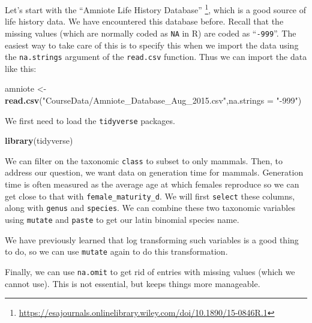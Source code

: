\documentclass[
  a4paperpaper,
]{book}
\newenvironment{Shaded}{\begin{snugshade}}{\end{snugshade}}
\newcommand{\DataTypeTok}[1]{\textcolor[rgb]{0.13,0.29,0.53}{#1}}
\newcommand{\KeywordTok}[1]{\textcolor[rgb]{0.13,0.29,0.53}{\textbf{#1}}}
\newcommand{\NormalTok}[1]{#1}
\newcommand{\StringTok}[1]{\textcolor[rgb]{0.31,0.60,0.02}{#1}}
\begin{document}
Let's start with the ``Amniote Life History Database'' \footnote{\url{https://esajournals.onlinelibrary.wiley.com/doi/10.1890/15-0846R.1}}, which is a good source of life history data. We have encountered this database before. Recall that the missing values (which are normally coded as \texttt{NA} in R) are coded as ``\texttt{-999}''. The easiest way to take care of this is to specify this when we import the data using the \texttt{na.strings} argument of the \texttt{read.csv} function. Thus we can import the data like this:

\begin{Shaded}
\begin{Highlighting}[]
\NormalTok{amniote \textless{}{-}}\StringTok{ }\KeywordTok{read.csv}\NormalTok{(}\StringTok{"CourseData/Amniote\_Database\_Aug\_2015.csv"}\NormalTok{,}\DataTypeTok{na.strings =} \StringTok{"{-}999"}\NormalTok{)}
\end{Highlighting}
\end{Shaded}

We first need to load the \texttt{tidyverse} packages.

\begin{Shaded}
\begin{Highlighting}[]
\KeywordTok{library}\NormalTok{(tidyverse)}
\end{Highlighting}
\end{Shaded}

We can filter on the taxonomic \texttt{class} to subset to only mammals. Then, to address our question, we want data on generation time for mammals. Generation time is often measured as the average age at which females reproduce so we can get close to that with \texttt{female\_maturity\_d}. We will first \texttt{select} these columns, along with \texttt{genus} and \texttt{species}. We can combine these two taxonomic variables using \texttt{mutate} and \texttt{paste} to get our latin binomial species name.

We have previously learned that log transforming such variables is a good thing to do, so we can use \texttt{mutate} again to do this transformation.

Finally, we can use \texttt{na.omit} to get rid of entries with missing values (which we cannot use). This is not essential, but keeps things more manageable.
\end{document}
